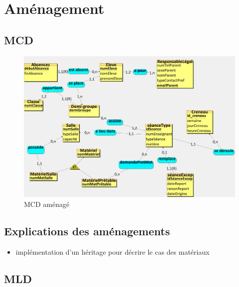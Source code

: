 \documentclass[12pt,french,titlepage]{article}
\begin{document}
    \section{Aménagement}
    
    \subsection{MCD}
    
    \begin{figure}[H]
	      \centering
	      \includegraphics[scale=0.08]{./mcd_amenage.jpg}
	      \caption{MCD aménagé}
	      
	   
	      
	  \end{figure}
	  
	  \subsection{Explications des aménagements}
	  
	  \begin{itemize}
	      \item implémentation d'un héritage pour décrire le cas des matériaux
	  \end{itemize}
	  
	  \subsection{MLD}
	  
\end{document}
